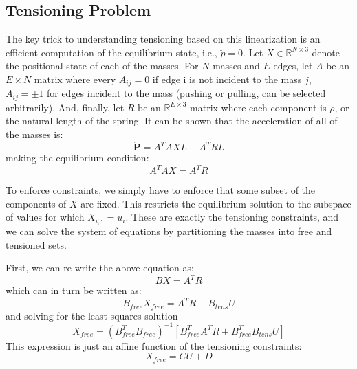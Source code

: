 \subsection*{Tensioning Problem}
The key trick to understanding tensioning based on this linearization is an efficient computation of the equilibrium state, i.e., $\ddot{p} = 0$.
Let $X \in \mathbb{R}^{N \times 3}$ denote the positional state of each of the masses.
For $N$ masses and $E$ edges, let $A$ be an $E \times N$ matrix where every $A_{ij} = 0$ if edge i is not incident to the mass $j$, $A_{ij} = \pm 1$ for edges incident to the mass (pushing or pulling, can be selected arbitrarily).
And, finally, let $R$ be an $\mathbb{R}^{E \times 3}$ matrix where each component is $\rho$, or the natural length of the spring.
It can be shown that the acceleration of all of the masses is:
\[
\ddot{\mathbf{P}} =  A^T A X L - A^T R L 
\]
making the equilibrium condition:
\[
 A^T A X  =  A^T R 
\]

To enforce constraints, we simply have to enforce that some subset of the components of $X$ are fixed.
This restricts the equilibrium solution to the subspace of values for which $X_{i,:} = u_i$.
These are exactly the tensioning constraints, and we can solve the system of equations by partitioning the masses into free and tensioned sets.

First, we can re-write the above equation as:
\[
B X =  A^T R
\]
which can in turn be written as:
\[
B_{free} X_{free}  = A^T R + B_{tens} U
\]
and solving for the least squares solution
\[
X_{free}  = (B_{free}^T B_{free})^{-1} [B_{free}^T A^T R + B_{free}^T B_{tens} U]
\]
This expression is just an affine function of the tensioning constraints:
\[
X_{free}  = C U + D
\]

